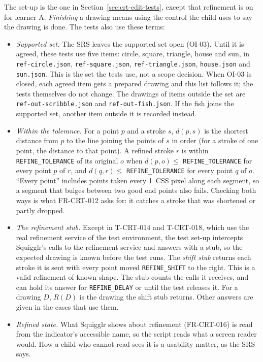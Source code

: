 \documentclass[12pt, titlepage]{article}
\begin{document}
The set-up is the one in Section~\ref{sec:crt-edit-tests}, except that
refinement is on for learner A. \emph{Finishing} a drawing means using the
control the child uses to say the drawing is done. The tests also use these
terms:
\begin{itemize}
\item \emph{Supported set.} The SRS leaves the supported set open (OI-03).
Until it is agreed, these tests use five items: circle, square, triangle,
house and sun, in \texttt{ref-\allowbreak{}circle.json},
\texttt{ref-\allowbreak{}square.json},
\texttt{ref-\allowbreak{}triangle.json}, \texttt{house.json} and
\texttt{sun.json}. This is the set the tests use, not a scope decision. When
OI-03 is closed, each agreed item gets a prepared drawing and this list
follows it; the tests themselves do not change. The drawings of items outside
the set are \texttt{ref-\allowbreak{}out-\allowbreak{}scribble.json} and
\texttt{ref-\allowbreak{}out-\allowbreak{}fish.json}. If the fish joins the
supported set, another item outside it is recorded instead.
\item \emph{Within the tolerance.} For a point $p$ and a stroke $s$, $d(p,
s)$ is the shortest distance from $p$ to the line joining the points of $s$
in order (for a stroke of one point, the distance to that point). A refined
stroke $r$ is within \texttt{REFINE\_TOLERANCE} of its original $o$ when
$d(p, o) \le$ \texttt{REFINE\_TOLERANCE} for every point $p$ of $r$, and
$d(q, r) \le$ \texttt{REFINE\_TOLERANCE} for every point $q$ of $o$. ``Every
point'' includes points taken every 1~CSS pixel along each segment, so a
segment that bulges between two good end points also fails. Checking both
ways is what FR-CRT-012 asks for: it catches a stroke that was shortened or
partly dropped.
\item \emph{The refinement stub.} Except in T-CRT-014 and T-CRT-018, which
use the real refinement service of the test environment, the test set-up
intercepts Squigglr's calls to the refinement service and answers with a
stub, so the expected drawing is known before the test runs. The
\emph{shift stub} returns each stroke it is sent with every point moved
\texttt{REFINE\_SHIFT} to the right. This is a valid refinement of known
shape. The stub counts the calls it receives, and can hold its answer for
\texttt{REFINE\_DELAY} or until the test releases it. For a drawing $D$,
$R(D)$ is the drawing the shift stub returns. Other answers are given in the
cases that use them.
\item \emph{Refined state.} What Squigglr shows about refinement
(FR-CRT-016) is read from the indicator's accessible name, so the script
reads what a screen reader would. How a child who cannot read sees it is a
usability matter, as the SRS says.
\end{itemize}
\end{document}
